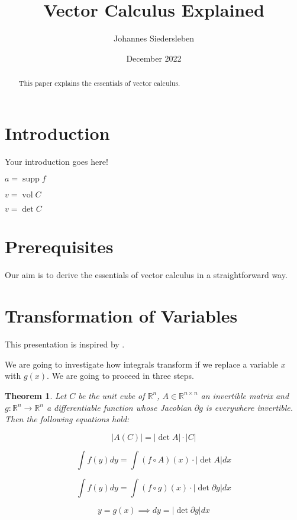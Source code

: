 \documentclass{article}
\title{Vector Calculus Explained}
\author{Johannes Siedersleben}
\date{December 2022}
\newtheorem{theorem}{Theorem}[section]
\DeclareMathOperator\supp{supp}
\DeclareMathOperator\vol{vol}
\begin{document}
\maketitle

\begin{abstract}
This paper explains the essentials of vector calculus.
\end{abstract}

\section{Introduction}

Your introduction goes here!

$a = \supp{f}$

$v = \vol{C}$

$v = \det{C}$

\section{Prerequisites}
Our aim is to derive the essentials of vector calculus in a straightforward way.


\section{Transformation of Variables}

This presentation is inspired by \cite{Forster3}.


We are going to investigate how integrals transform if we replace a variable $x$ with $g(x)$. We are going to proceed in three steps.



\begin{theorem}
 Let $C$ be the unit cube of $\mathbb{R}^{n}$, $A \in \mathbb{R}^{n\times n}$ an invertible matrix and 
 $g : \mathbb{R}^{n} \longrightarrow \mathbb{R}^n$ a differentiable function whose Jacobian $\partial g$ is everywhere invertible. Then the following equations hold:

\begin{equation} \label{eq: volume}
\lvert A(C) \rvert =  \lvert \det A  \rvert \cdot \lvert C \rvert
\end{equation}

\begin{equation} \label{eq: linear_subst}
 \int f(y) dy = \int (f\circ A) (x) \cdot  \lvert \det A \rvert dx
\end{equation}

\begin{equation} \label{eq: gen_subst}
 \int f(y) dy = \int (f\circ g) (x) \cdot  \lvert \det \partial g  \rvert dx
\end{equation}

\begin{equation} \label{eq: gen_subst_short}
 y = g(x) \implies dy = \lvert \det \partial g \rvert dx
\end{equation}
\end{theorem}
\end{document}
